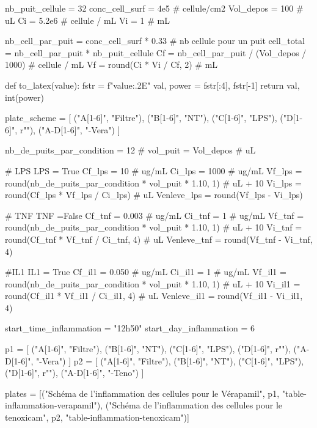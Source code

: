 \documentclass[a4paper,12pt]{article}
\newcommand{\PATH}[2]{"C:/Users/Florian/OneDrive - Universite de Montreal/LaTeX/BioTex/BioTex/#1/#2"}
\begin{document}
\begin{pycode}

nb_puit_cellule = 32
conc_cell_surf = 4e5 # cellule/cm2 
Vol_depos  = 100 # uL
Ci = 5.2e6 # cellule / mL
Vi = 1 # mL

nb_cell_par_puit = conc_cell_surf * 0.33 # nb cellule pour un puit
cell_total = nb_cell_par_puit * nb_puit_cellule
Cf = nb_cell_par_puit / (Vol_depos / 1000) # cellule / mL
Vf = round(Ci * Vi / Cf, 2) # mL

def to_latex(value):
    fstr = f"{value:.2E}"
    val, power = fstr[:4], fstr[-1]
    return val, int(power)

\end{pycode}


\begin{pycode}
plate_scheme = [
	("A[1-6]", "Filtre"),
	("B[1-6]", "NT"),
	("C[1-6]", "LPS"),
	("D[1-6]", r"\IL"),
	("A-D[1-6]", "-Vera")
]
\end{pycode}



\begin{pycode}

nb_de_puits_par_condition = 12 #
vol_puit = Vol_depos # uL

# LPS
LPS = True 
Cf_lps = 10 # ug/mL
Ci_lps = 1000 # ug/mL
Vf_lps = round(nb_de_puits_par_condition * vol_puit * 1.10, 1) # uL + 10 %
Vi_lps = round(Cf_lps * Vf_lps / Ci_lps) # uL
Venleve_lps = round(Vf_lps - Vi_lps)

# TNF
TNF =False
Cf_tnf = 0.003 # ug/mL
Ci_tnf = 1 # ug/mL
Vf_tnf = round(nb_de_puits_par_condition * vol_puit * 1.10, 1) # uL + 10 %
Vi_tnf = round(Cf_tnf * Vf_tnf / Ci_tnf, 4) # uL
Venleve_tnf = round(Vf_tnf - Vi_tnf, 4)

#IL1
IL1 = True
Cf_il1 = 0.050 # ug/mL
Ci_il1 = 1 # ug/mL
Vf_il1 = round(nb_de_puits_par_condition * vol_puit * 1.10, 1) # uL + 10 %
Vi_il1 = round(Cf_il1 * Vf_il1 / Ci_il1, 4) # uL
Venleve_il1 = round(Vf_il1 - Vi_il1, 4)

\end{pycode}


\begin{pycode}
start_time_inflammation = "12h50"
start_day_inflammation = 6

p1 = [
	("A[1-6]", "Filtre"),
	("B[1-6]", "NT"),
	("C[1-6]", "LPS"),
	("D[1-6]", r"\IL"),
	("A-D[1-6]", "-Vera")
]
p2 = [
	("A[1-6]", "Filtre"),
	("B[1-6]", "NT"),
	("C[1-6]", "LPS"),
	("D[1-6]", r"\IL"),
	("A-D[1-6]", "-Teno")
]

plates = [("Schéma de l'inflammation des cellules pour le Vérapamil", p1, "table-inflammation-verapamil"), ("Schéma de l'inflammation des cellules pour le tenoxicam", p2, "table-inflammation-tenoxicam")]

\end{pycode}
\end{document}
